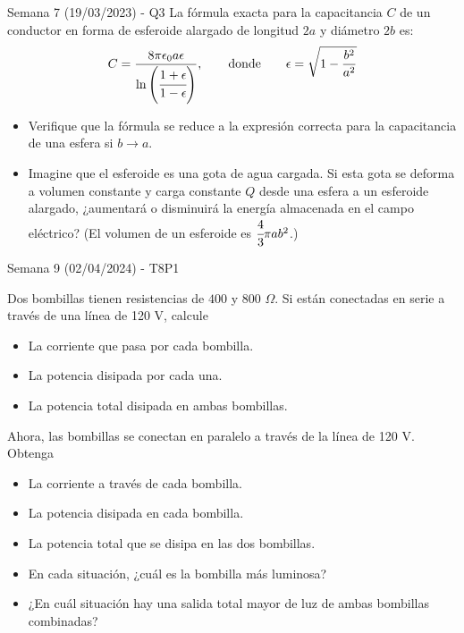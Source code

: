 \begin{frame}{Semana 7 (19/03/2023) - Q3}
La fórmula exacta para la capacitancia $C$ de un conductor en forma de esferoide alargado de longitud $2a$ y diámetro $2b$ es: $$C=\frac{8\pi\epsilon_0 a\epsilon}{\ln\left(\cfrac{1+\epsilon}{1-\epsilon}\right)},\qquad \text{donde} \qquad \epsilon=\sqrt{1-\frac{b^2}{a^2}}$$

\begin{itemize}
    \item[a)] Verifique que la fórmula se reduce a la expresión correcta para la capacitancia de una esfera si $b \rightarrow a$.
    \item[b)] Imagine que el esferoide es una gota de agua cargada. Si esta gota se deforma a volumen constante y carga constante $Q$ desde una esfera a un esferoide alargado, ¿aumentará o disminuirá la energía almacenada en el campo eléctrico? (El volumen de un esferoide es $\cfrac{4}{3}\pi ab^2$.)
\end{itemize}

\end{frame}

\begin{frame}{Semana 9 (02/04/2024) - T8P1}
    
    Dos bombillas tienen
resistencias de $400$ y $800$ $\Omega$. Si están conectadas en serie a través 
de una línea de 120 V, calcule 
    
    \begin{itemize}
        \item[a)] La corriente que pasa por cada bombilla.
        \item[b)] La potencia disipada por cada una.
        \item[c)] La potencia total disipada
en ambas bombillas.
    \end{itemize}

    Ahora, las bombillas se conectan en paralelo a
través de la línea de 120 V. Obtenga

    \begin{itemize}
        \item[d)] La corriente a través de cada
bombilla.
        \item[e)] La potencia disipada en cada bombilla.
        \item[f)] La potencia total
que se disipa en las dos bombillas.
        \item[g)] En cada situación, ¿cuál es la
bombilla más luminosa?
        \item[h)] ¿En cuál situación hay una salida total
mayor de luz de ambas bombillas combinadas?
    \end{itemize}
    
\end{frame}

